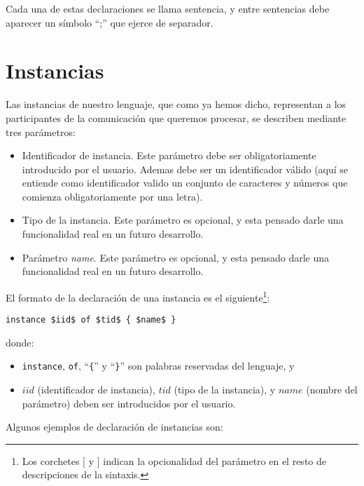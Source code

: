 Cada una de estas declaraciones se llama sentencia, y entre sentencias
debe aparecer un símbolo ``;'' que ejerce de separador.

\section{Instancias}\label{sec:Instancias}

Las instancias de nuestro lenguaje, que como ya hemos dicho,
representan a los participantes de la comunicación que queremos
procesar, se describen mediante tres
parámetros:

\begin{itemize}
\item Identificador de instancia. Este parámetro debe ser
  obligatoriamente introducido por el usuario. Ademas debe ser un
  identificador válido (aquí se entiende como identificador valido un
  conjunto de caracteres y números que comienza obligatoriamente por
  una letra).
\item Tipo de la instancia. Este parámetro es opcional, y esta pensado
  darle una funcionalidad real en un futuro desarrollo.
\item Parámetro \textit{name}. Este parámetro es opcional, y esta
  pensado darle una funcionalidad real en un futuro desarrollo.
\end{itemize}

El formato de la declaración de una instancia es el siguiente\footnote{Los corchetes $[$ y $]$ indican la opcionalidad del parámetro en el resto de descripciones de la sintaxis.}:
\begin{center}
  \begin{minipage}{0.40\linewidth}
\begin{lstlisting}[mathescape]
instance $iid$ of $tid$ { $name$ }
\end{lstlisting}
  \end{minipage}
\end{center}
donde:
\begin{itemize}
\item \lstinline{instance}, \lstinline{of}, ``\lstinline!{!'' y
    ``\lstinline!}!'' son palabras reservadas del lenguaje, y
\item $iid$ (identificador de instancia), $tid$ (tipo de la
  instancia), y $name$ (nombre del parámetro) deben ser introducidos
  por el usuario.
\end{itemize}

Algunos ejemplos de declaración de instancias son:

